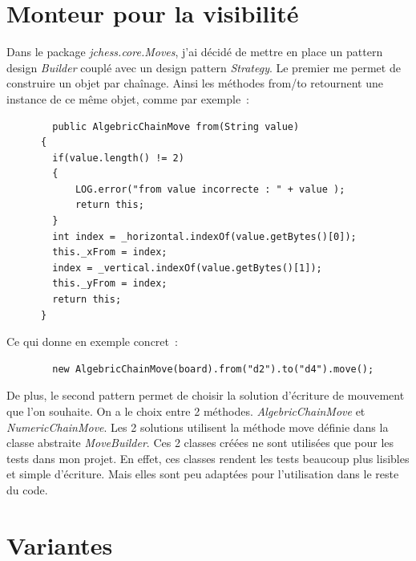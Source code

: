 \documentclass{article}
\begin{document}
	\section{Monteur pour la visibilité}
	\label{sec:Monteur pour la visibilite}
	Dans le package \emph{jchess.core.Moves}, j'ai décidé de mettre en place un pattern design \emph{Builder} couplé avec un design pattern \emph{Strategy}. Le premier me permet de construire un objet par chaînage. Ainsi les méthodes from/to retournent une instance de ce même objet, comme par exemple~:
	\begin{verbatim}
		public AlgebricChainMove from(String value)
	  {
	  	if(value.length() != 2)
	  	{
	   		LOG.error("from value incorrecte : " + value );
	   		return this;
	   	}
	   	int index = _horizontal.indexOf(value.getBytes()[0]);
	  	this._xFrom = index;
	   	index = _vertical.indexOf(value.getBytes()[1]);
	   	this._yFrom = index;
	   	return this;
	  }
	\end{verbatim}
	Ce qui donne en exemple concret~:
	\begin{verbatim}
		new AlgebricChainMove(board).from("d2").to("d4").move();
	\end{verbatim}
	De plus, le second pattern permet de choisir la solution d'écriture de mouvement que l'on souhaite. On a le choix entre 2 méthodes. \emph{AlgebricChainMove} et \emph{NumericChainMove}. Les 2 solutions utilisent la méthode move définie dans la classe abstraite \emph{MoveBuilder}. Ces 2 classes créées ne sont utilisées que pour les tests dans mon projet. En effet, ces classes rendent les tests beaucoup plus lisibles et simple d'écriture. Mais elles sont peu adaptées pour l'utilisation dans le reste du code.

	\section{Variantes}
	\label{sec:Variantes}
\end{document}
